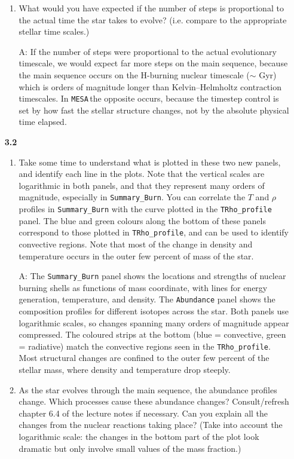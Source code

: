 \documentclass[11pt,a4paper]{article}
\newcommand{\MESA}{\texttt{MESA}\,}
\begin{document}
\begin{enumerate}
\begin{enumerate}[start =6]
  \item What would you have expected if the number of steps is proportional to the actual time the star takes to evolve? (i.e. compare to the appropriate stellar time scales.)
  
{\color{blue} A: If the number of steps were proportional to the actual evolutionary timescale, we would expect far more steps on the main sequence, because the main sequence occurs on the H-burning nuclear timescale ($\sim$ Gyr) which is orders of magnitude longer than Kelvin–Helmholtz contraction timescales. In \MESA the opposite occurs, because the timestep control is set by how fast the stellar structure changes, not by the absolute physical time elapsed.}

\end{enumerate}


\item[\bf{3.2}] 
\begin{enumerate}
\item Take some time to understand what is plotted in these two new panels, and identify each line in the plots. Note that the vertical scales are logarithmic in both panels, and that they represent many orders of magnitude, especially in \verb|Summary_Burn|. You can correlate the $T$ and $\rho$ profiles in \verb|Summary_Burn| with the curve plotted in the \verb|TRho_profile| panel.  The blue and green colours along the bottom of these panels correspond to those plotted in \verb|TRho_profile|, and can be used to identify convective regions. Note that most of the change in density and temperature occurs in the outer few percent of mass of the star.

{\color{blue} A: The \texttt{Summary\_Burn} panel shows the locations and strengths of nuclear burning shells as functions of mass coordinate, with lines for energy generation, temperature, and density. The \texttt{Abundance} panel shows the composition profiles for different isotopes across the star. Both panels use logarithmic scales, so changes spanning many orders of magnitude appear compressed. The coloured strips at the bottom (blue = convective, green = radiative) match the convective regions seen in the \texttt{TRho\_profile}. Most structural changes are confined to the outer few percent of the stellar mass, where density and temperature drop steeply.}

\item As the star evolves through the main sequence, the abundance profiles change. Which processes cause these abundance changes? Consult/refresh chapter 6.4 of the lecture notes if necessary. Can you explain all the changes from the nuclear reactions taking place? (Take into account the logarithmic scale: the changes in the bottom part of the plot look dramatic but only involve small values of the mass fraction.)


\end{enumerate}
\end{enumerate}
\end{document}
